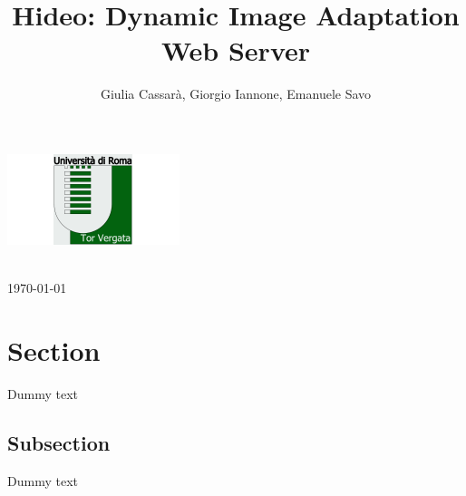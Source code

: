 \documentclass[italian,a4paper, 12pt]{article}
\title{Hideo: Dynamic Image Adaptation Web Server}
\author{Giulia Cassarà, Giorgio Iannone, Emanuele Savo}
\date{}
\def\blankpage{%
      \clearpage%
      \thispagestyle{empty}%
      \addtocounter{page}{-1}%
      \null%
      \clearpage}
\begin{document}
\makeatletter
    \begin{titlepage}
        \begin{center}
            \includegraphics{uniroma2-logo}
            \vfill
            \vfill
            {\huge \bfseries  \@title }\\[2ex] 
            \vfill
            \vfill
            \vfill
            {\LARGE  \@author}\\[50ex] 
            {\large \@date}
        \end{center}
    \end{titlepage}
\makeatother
\thispagestyle{empty}
\newpage

\centering
\maketitle
\vspace*{1\baselineskip}
\today


\blankpage


\tableofcontents
\newpage

\section{Section}

Dummy text

\subsection{Subsection}

Dummy text
\end{document}

